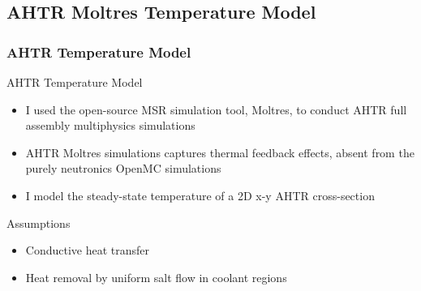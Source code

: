 \subsection{AHTR Moltres Temperature Model}
\begin{frame}
    \frametitle{AHTR Temperature Model}
    \begin{block}{AHTR Temperature Model}
        \begin{itemize}
            \item I used the open-source MSR simulation tool, Moltres, to conduct AHTR
            full assembly multiphysics simulations 
            \item AHTR Moltres simulations captures thermal feedback effects, absent
            from the purely neutronics OpenMC simulations
            \item I model the steady-state temperature of a 2D x-y AHTR cross-section
        \end{itemize}
    \end{block}
    \begin{block}{Assumptions}
        \begin{itemize}
            \item Conductive heat transfer 
            \item Heat removal by uniform salt flow in coolant regions
        \end{itemize}
    \end{block}

\end{frame}

